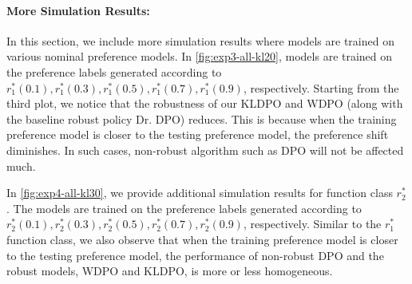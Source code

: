 \paragraph{More Simulation Results:} 

In this section, we include more simulation results where models are trained on various nominal preference models. In \cref{fig:exp3-all-kl20}, models are trained on the preference labels generated according to $r^*_1(0.1),r^*_1(0.3), r^*_1(0.5),r^*_1(0.7),r^*_1(0.9)$, respectively. Starting from the third plot, we notice that the robustness of our KLDPO and WDPO (along with the baseline robust policy Dr. DPO) reduces. This is because when the training preference model is closer to the testing preference model, the preference shift diminishes. In such cases, non-robust algorithm such as DPO will not be affected much.

In \cref{fig:exp4-all-kl30}, we provide additional simulation results for function class $r^*_2$. The models are trained on the preference labels generated according to $r^*_2(0.1),r^*_2(0.3),r^*_2(0.5),r^*_2(0.7),r^*_2(0.9)$, respectively. Similar to the $r^*_1$ function class, we also observe that when the training preference model is closer to the testing preference model, the performance of non-robust DPO and the robust models, WDPO and KLDPO, is more or less homogeneous. 


